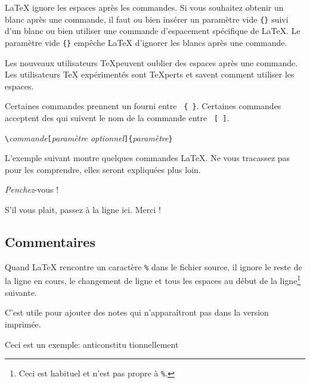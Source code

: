 %
%
\label{whitespace}
\LaTeX{} ignore les espaces après les commandes. Si vous souhaitez
obtenir un blanc après une commande,
il faut ou bien insérer un paramètre vide \verb|{}| suivi d'un blanc
ou bien utiliser une commande d'espacement spécifique de \LaTeX{}. Le
paramètre vide \verb|{}| empêche \LaTeX{} d'ignorer les blancs après une
commande.

\begin{example}
Les nouveaux utilisateurs \TeX peuvent
oublier des espaces après une commande. %
Les utilisateurs \TeX{} expérimentés sont
\TeX perts et savent comment utiliser les
espaces. %
\end{example}

Certaines commandes prennent un  fourni entre
~\verb|{ }|. Certaines commandes acceptent des
 qui suivent le nom de la commande entre
~\verb|[ ]|.
\begin{code}
\verb|\|\textit{commande}\verb|[|\textit{paramètre optionnel}\verb|]{|\textit{paramètre}\verb|}|
\end{code}
L'exemple suivant montre quelques commandes \LaTeX{}. Ne vous
tracassez pas pour les comprendre, elles seront expliquées plus loin.

\begin{example}
\textsl{Penchez}-vous !
\end{example}
\begin{example}
S'il vous plait, passez \`a la
ligne ici.\newline
Merci !
\end{example}

\subsection{Commentaires}

Quand \LaTeX{} rencontre un caractère \verb|%| dans le fichier
source, il ignore le reste de la ligne en cours, le changement de ligne
et tous les espaces au début de la ligne\footnote{Ceci est habituel et n'est pas propre à \texttt{\%}.
  \NdT}  suivante.

C'est utile pour ajouter des notes qui n'apparaîtront pas dans la
version imprimée.

\begin{example}
Ceci est un %
exemple: anticonstitu%
       tionnellement
\end{example}

